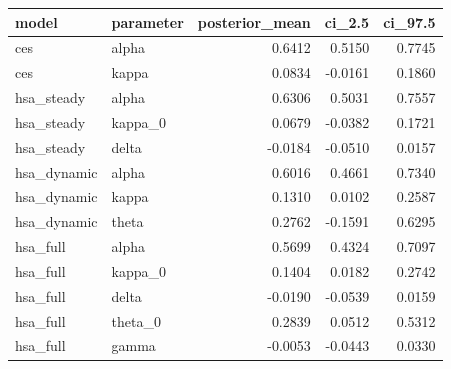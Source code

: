 \begin{tabular}{llrrr}
\toprule
model & parameter & posterior\_mean & ci\_2.5 & ci\_97.5 \\
\midrule
ces & alpha & 0.6412 & 0.5150 & 0.7745 \\
ces & kappa & 0.0834 & -0.0161 & 0.1860 \\
hsa\_steady & alpha & 0.6306 & 0.5031 & 0.7557 \\
hsa\_steady & kappa\_0 & 0.0679 & -0.0382 & 0.1721 \\
hsa\_steady & delta & -0.0184 & -0.0510 & 0.0157 \\
hsa\_dynamic & alpha & 0.6016 & 0.4661 & 0.7340 \\
hsa\_dynamic & kappa & 0.1310 & 0.0102 & 0.2587 \\
hsa\_dynamic & theta & 0.2762 & -0.1591 & 0.6295 \\
hsa\_full & alpha & 0.5699 & 0.4324 & 0.7097 \\
hsa\_full & kappa\_0 & 0.1404 & 0.0182 & 0.2742 \\
hsa\_full & delta & -0.0190 & -0.0539 & 0.0159 \\
hsa\_full & theta\_0 & 0.2839 & 0.0512 & 0.5312 \\
hsa\_full & gamma & -0.0053 & -0.0443 & 0.0330 \\
\bottomrule
\end{tabular}
